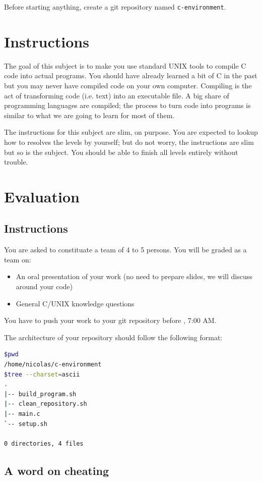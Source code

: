 \documentclass[12pt]{article}
\begin{document}
Before starting anything, create a git repository named \texttt{c-environment}.

\section{Instructions}

The goal of this subject is to make you use standard UNIX tools to compile C code into actual programs. You should have already learned a bit of C in the past but you may never have compiled code on your own computer.
Compiling is the act of transforming code (i.e. text) into an executable file. A big share of programming languages are compiled; the process to turn code into programs is similar to what we are going to learn for most of them.

The instructions for this subject are slim, on purpose. You are expected to lookup how to resolves the levels by yourself; but do not worry, the instructions are slim but so is the subject. You should be able to finish all levels entirely without trouble.

\section{Evaluation}
\subsection{Instructions}

You are asked to constituate a team of 4 to 5 persons. You will be graded as a team on:
\begin{itemize}
	\item An oral presentation of your work (no need to prepare slides, we will discuss around your code)
	\item General C/UNIX knowledge questions
\end{itemize}

You have to push your work to your git repository before , 7:00 AM.

The architecture of your repository should follow the following format:
\begin{lstlisting}[language=bash]
$pwd
/home/nicolas/c-environment
$tree --charset=ascii
.
|-- build_program.sh
|-- clean_repository.sh
|-- main.c
`-- setup.sh

0 directories, 4 files
\end{lstlisting}

\subsection{A word on cheating}
\end{document}

